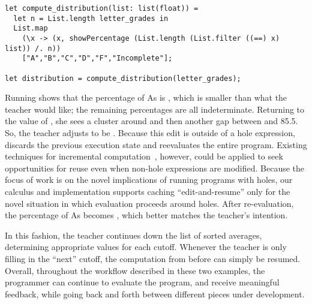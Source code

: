 \begin{lstlisting}
let compute_distribution(list: list(float)) =
  let n = List.length letter_grades in
  List.map
    (\x -> (x, showPercentage (List.length (List.filter ((==) x) list)) /. n))
    ["A","B","C","D","F","Incomplete"];

let distribution = compute_distribution(letter_grades);
\end{lstlisting}

\noindent
%
Running  shows that the percentage of As is
, which is smaller than what the teacher would like;
the remaining percentages are all indeterminate.
%
Returning to the value of , she sees a cluster around 
and then another gap between  and {85.5}.
%
So, the teacher adjusts  to be .
%
Because this edit is outside of a hole expression, \HazelnutLive{} discards the
previous execution state and reevaluates the entire program.
%
Existing techniques for incremental computation~\cite{XXX,XXX}, however, could
be applied to seek opportunities for reuse even when non-hole expressions are
modified.
%
Because the focus of work is on the novel implications of running programs with
holes, our calculus and implementation supports caching ``edit-and-resume'' only
for the novel situation in which evaluation proceeds around holes.
%
After re-evaluation, the percentage of As becomes , which better
matches the teacher's intention.

In this fashion, the teacher continues down the list of sorted averages,
determining appropriate values for each cutoff.
%
Whenever the teacher is only filling in the ``next'' cutoff, the computation
from before can simply be resumed.
%
Overall, throughout the workflow described in these two examples, the programmer
can continue to evaluate the program, and receive meaningful feedback, while
going back and forth between different pieces under development.
